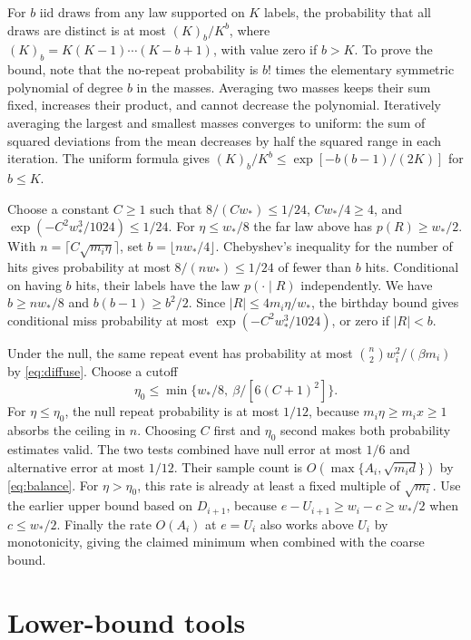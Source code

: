 \documentclass[11pt]{article}
\begin{document}
For \(b\) iid draws from any law supported on \(K\) labels, the probability that all draws are distinct is at most \((K)_b/K^b\), where \((K)_b=K(K-1)\cdots(K-b+1)\), with value zero if \(b>K\). To prove the bound, note that the no-repeat probability is \(b!\) times the elementary symmetric polynomial of degree \(b\) in the masses. Averaging two masses keeps their sum fixed, increases their product, and cannot decrease the polynomial. Iteratively averaging the largest and smallest masses converges to uniform: the sum of squared deviations from the mean decreases by half the squared range in each iteration. The uniform formula gives \((K)_b/K^b\le \exp[-b(b-1)/(2K)]\) for \(b\le K\).

Choose a constant \(C\ge1\) such that \(8/(Cw_*)\le1/24\), \(Cw_*/4\ge4\), and \(\exp(-C^2w_*^3/1024)\le1/24\). For \(\eta\le w_*/8\) the far law above has \(p(R)\ge w_*/2\). With \(n=\lceil C\sqrt{m_i\eta}\rceil\), set \(b=\lfloor n w_*/4\rfloor\). Chebyshev's inequality for the number of hits gives probability at most \(8/(n w_*)\le1/24\) of fewer than \(b\) hits. Conditional on having \(b\) hits, their labels have the law \(p(\cdot\mid R)\) independently. We have \(b\ge n w_*/8\) and \(b(b-1)\ge b^2/2\). Since \(|R|\le 4m_i\eta/w_*\), the birthday bound gives conditional miss probability at most \(\exp(-C^2w_*^3/1024)\), or zero if \(|R|<b\).

Under the null, the same repeat event has probability at most \(\binom n2 w_i^2/(\beta m_i)\) by \eqref{eq:diffuse}. Choose a cutoff
\[
 \eta_0\le\min\{w_*/8,\ \beta/[6(C+1)^2]\}.
\]
For \(\eta\le\eta_0\), the null repeat probability is at most \(1/12\), because \(m_i\eta\ge m_i x\ge1\) absorbs the ceiling in \(n\). Choosing \(C\) first and \(\eta_0\) second makes both probability estimates valid. The two tests combined have null error at most \(1/6\) and alternative error at most \(1/12\). Their sample count is \(O(\max\{A_i,\sqrt{m_i d}\})\) by \eqref{eq:balance}. For \(\eta>\eta_0\), this rate is already at least a fixed multiple of \(\sqrt{m_i}\). Use the earlier upper bound based on \(D_{i+1}\), because \(e-U_{i+1}\ge w_i-c\ge w_*/2\) when \(c\le w_*/2\). Finally the rate \(O(A_i)\) at \(e=U_i\) also works above \(U_i\) by monotonicity, giving the claimed minimum when combined with the coarse bound.

\section{Lower-bound tools}
\end{document}
